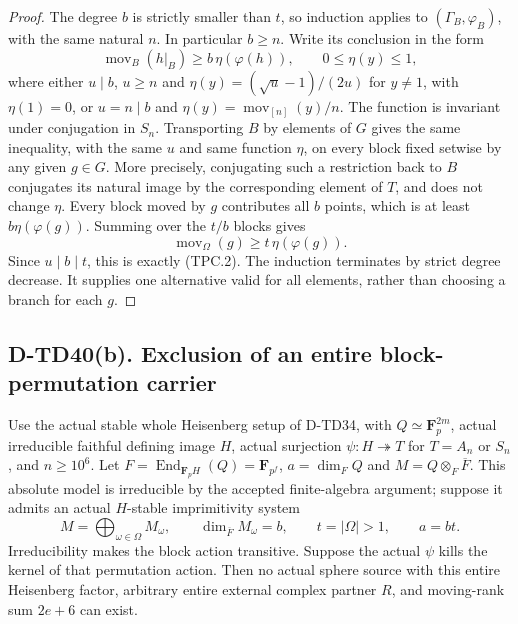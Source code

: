 \begin{proof}
The degree $b$ is strictly smaller than $t$, so induction applies
to $(\Gamma_B,\varphi_B)$, with the same natural $n$.
In particular $b\ge n$.  Write its conclusion in the form
\[
 \operatorname{mov}_{B}(h|_B)\ge b\,\eta(\varphi(h)),
 \qquad 0\le\eta(y)\le1,
 \tag{TPC.8}
\]
where either $u\mid b$, $u\ge n$ and
$\eta(y)=(\sqrt u-1)/(2u)$ for $y\ne1$, with $\eta(1)=0$,
or $u=n\mid b$ and $\eta(y)=\operatorname{mov}_{[n]}(y)/n$.
The function is invariant under conjugation in $S_n$.
Transporting $B$ by elements of $G$ gives the same inequality,
with the same $u$ and same function $\eta$, on every block
fixed setwise by any given $g\in G$.  More precisely, conjugating
such a restriction back to $B$ conjugates its natural image by
the corresponding element of $T$, and does not change $\eta$.
Every block moved by $g$ contributes all $b$ points, which is
at least $b\eta(\varphi(g))$.  Summing over the $t/b$ blocks gives
\[
             \operatorname{mov}_{\Omega}(g)
                            \ge t\,\eta(\varphi(g)).
 \tag{TPC.9}
\]
Since $u\mid b\mid t$, this is exactly (TPC.2).  The induction
terminates by strict degree decrease.  It supplies one alternative
valid for all elements, rather than choosing a branch for each $g$.
\end{proof}

\subsection*{D-TD40(b). Exclusion of an entire block-permutation carrier}

Use the actual stable whole Heisenberg setup of D-TD34, with
$Q\simeq\mathbf F_p^{2m}$, actual irreducible faithful defining
image $H$, actual surjection $\psi:H\twoheadrightarrow T$
for $T=A_n$ or $S_n$, and $n\ge10^6$.
Let $F=\operatorname{End}_{\mathbf F_pH}(Q)=\mathbf F_{p^f}$,
$a=\dim_FQ$ and $M=Q\otimes_F\overline F$.
This absolute model is irreducible by the accepted finite-algebra
argument; suppose it admits an actual $H$-stable imprimitivity system
\[
 M=\bigoplus_{\omega\in\Omega}M_\omega,\qquad
 \dim_{\overline F}M_\omega=b,\qquad t=|\Omega|>1,
 \qquad a=bt.
 \tag{TPC.10}
\]
Irreducibility makes the block action transitive.  Suppose the
actual $\psi$ kills the kernel of that permutation action.
Then no actual sphere source with this entire Heisenberg factor,
arbitrary entire external complex partner $R$, and moving-rank
sum $2e+6$ can exist.


